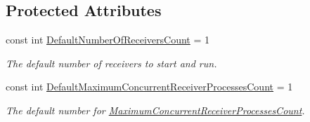 \subsection*{Protected Attributes}
\begin{DoxyCompactItemize}
\item 
const int \hyperlink{classCqrs_1_1Azure_1_1ServiceBus_1_1AzureBus_a19642a14d6cf036cbbdb68b9ba7e635d_a19642a14d6cf036cbbdb68b9ba7e635d}{Default\+Number\+Of\+Receivers\+Count} = 1
\begin{DoxyCompactList}\small\item\em The default number of receivers to start and run. \end{DoxyCompactList}\item 
const int \hyperlink{classCqrs_1_1Azure_1_1ServiceBus_1_1AzureBus_a12c3d07b7ad1836e85a449e6adc8b5df_a12c3d07b7ad1836e85a449e6adc8b5df}{Default\+Maximum\+Concurrent\+Receiver\+Processes\+Count} = 1
\begin{DoxyCompactList}\small\item\em The default number for \hyperlink{classCqrs_1_1Azure_1_1ServiceBus_1_1AzureBus_a6b517888d91c6a5b026cb5857e75a04f_a6b517888d91c6a5b026cb5857e75a04f}{Maximum\+Concurrent\+Receiver\+Processes\+Count}. \end{DoxyCompactList}\end{DoxyCompactItemize}
